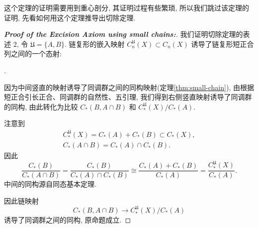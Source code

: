         这个定理的证明需要用到重心剖分, 其证明过程有些繁琐, 所以我们跳过该定理的证明, 先看如何用这个定理推导出切除定理.

        \begin{proof}[{\bf Proof of the Excision Axiom using small chains:}]\hfill
            
            我们证明切除定理的表述 $2$, 令 $\mathfrak{U} = \{A,B\}$. 链复形的嵌入映射 $C^{\mathfrak{U}}_n(X)\subset C_n(X)$ 诱导了链复形短正合列之间的一个态射:
            
            \vspace{8pt}
            .
            \vspace{8pt}

            因为中间竖直的映射诱导了同调群之间的同构映射(定理\ref{thm:small-chain}), 由根据短正合引长正合、同调群的自然性、五引理, 
            我们得到右侧竖直映射诱导了同调群的同构, 由此转化为比较 $C_*(B,A\cap B)$ 和 $C^{\mathfrak{U}}_{*}(X)/C_*(A)$.

            注意到
            \begin{gather*}
                C^{\mathfrak{U}}_{*}(X) = C_*(A)+C_*(B)\subset C_*(X), \\
                C_*(A\cap B) = C_*(A)\cap C_*(B).
            \end{gather*}
            因此
            \begin{equation*}
                \frac{C_*(B)}{C_*(A\cap B)}=\frac{C_*(B)}{C_*(A)\cap C_*(B)}\cong\frac{C_*(A)+C_*(B)}{C_*(A)}=\frac{C^{\mathfrak{U}}_{*}(X)}{C_*(A)}.
            \end{equation*}
            中间的同构源自同态基本定理. 

            因此链映射
            \begin{equation*}
                C_*(B,A\cap B)\rightarrow C_*^{\mathfrak{U}}(X)/C_*(A)
            \end{equation*}
            诱导了同调群之间的同构, 原命题成立.
        \end{proof}

